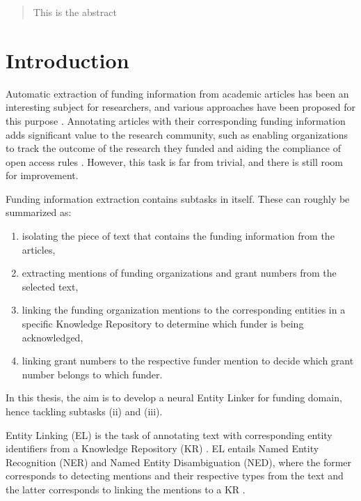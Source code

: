\documentclass{article}
\theoremstyle{definition}
\theoremstyle{remark}
\begin{document}
\newpage

\begin{abstract}
This is the abstract
\end{abstract}
\newpage
\section{Introduction}
\label{sec:intro}
Automatic extraction of funding information from academic articles has been an interesting subject for researchers, and various approaches have been proposed for this purpose \cite{ElsPaper,AckExtract,GrantExtractor}. Annotating articles with their corresponding funding information adds significant value to the research community, such as enabling organizations to track the outcome of the research they funded \cite{ElsPaper} and aiding the compliance of open access rules \cite{GrantExtractor}. However, this task is far from trivial, and there is still room for improvement.

Funding information extraction contains subtasks in itself. These can roughly be summarized as:
\renewcommand{\labelenumi}{(\roman{enumi})}
\begin{enumerate}
     \vspace{-0.3cm}\item isolating the piece of text that contains the funding information from the articles,
     \vspace{-0.6cm}\item extracting mentions of funding organizations and grant numbers from the selected text,
     \vspace{-0.3cm}\item linking the funding organization mentions to the corresponding entities in a specific Knowledge Repository to determine which funder is being acknowledged,
     \vspace{-0.3cm}\item linking grant numbers to the respective funder mention to decide which grant number belongs to which funder. 
\end{enumerate}

\vspace{-0.3cm}\noindent In this thesis, the aim is to develop a neural Entity Linker for funding domain, hence tackling subtasks (ii) and (iii).


Entity Linking (EL) is the task of annotating text with corresponding entity identifiers from a Knowledge Repository (KR) \cite{balog}. EL entails Named Entity Recognition (NER) and Named Entity Disambiguation (NED), where the former corresponds to detecting mentions and their respective types from the text and the latter corresponds to linking the mentions to a KR \cite{balog}. 
\end{document}

